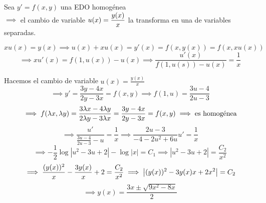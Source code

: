 \begin{prop}
    Sea $y'=f(x,y)$ una EDO homogénea \\
    $\implies$ el cambio de variable $\displaystyle u(x)=\frac{y(x)}{x}$ la transforma en una de variables separadas.
    \begin{dem}
        \[xu(x)=y(x) \implies u(x)+xu(x)=y'(x)=f(x, y(x))=f(x, xu(x))\]
        \[\implies xu'(x)=f(1, u(x))-u(x) \implies \frac{u'(x)}{f(1, u(s))-u(x)}=\frac{1}{x}\]
    \end{dem}
\end{prop}
\begin{ejem}[$4x-3y+y'(2y-3x)=0$]
    Hacemos el cambio de variable $u(x)=\frac{y(x)}{x}$
    \[\implies y'=\frac{3y-4x}{2y-3x}=f(x,y) \implies f(1, u)=\frac{3u-4}{2u-3}\]
    \[\implies f(\lambda x, \lambda y)=\frac{3\lambda x-4\lambda y}{2\lambda y-3\lambda x}=\frac{3y-4x}{2y-3x}=f(x,y) \implies \text{es homogénea}\]
    \[\implies \frac{u'}{\frac{3u-4}{2u-3}-u}=\frac{1}{x} \implies \frac{2u-3}{-4-2u^2+6u}u'=\frac{1}{x}\]
    \[\implies -\frac{1}{2}\log{|u^2-3u+2|}-\log{|x|}=C_1 \implies |u^2-3u+2|=\frac{C_2}{x^2}\]
    \[\implies \frac{(y(x))^2}{x}-\frac{3y(x)}{x}+2=\frac{C_2}{x^2} \implies \left|(y(x))^2-3y(x)x+2x^2\right|=C_2\]
    \[\implies \boxed{y(x)=\frac{3x\pm \sqrt{9x^2-8x}}{2}}\]
\end{ejem}

